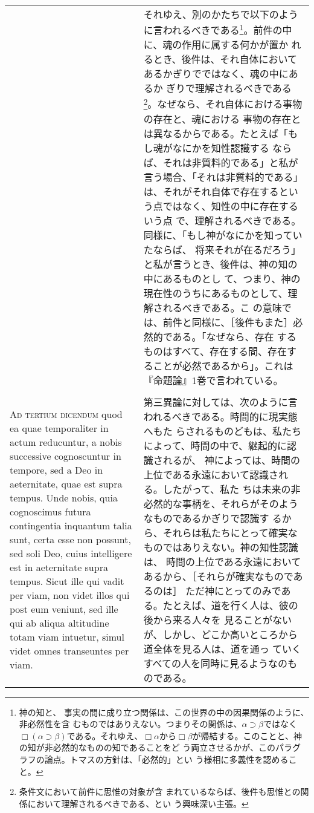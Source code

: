 \documentclass[10pt]{jsarticle} %
\begin{document}
\begin{longtable}{p{21em}p{21em}}
&

それゆえ、別のかたちで以下のように言われるべきである\footnote{神の知と、
事実の間に成り立つ関係は、この世界の中の因果関係のように、非必然性を含
むものではありえない。つまりその関係は、$\alpha \supset \beta$ではなく
$\Box(\alpha \supset \beta)$である。それゆえ、$\Box \alpha$から$\Box
\beta$が帰結する。このことと、神の知が非必然的なものの知であることをど
う両立させるかが、このパラグラフの論点。トマスの方針は、「必然的」とい
う様相に多義性を認めること。}。前件の中に、魂の作用に属する何かが置か
れるとき、後件は、それ自体においてあるかぎりでではなく、魂の中にあるか
ぎりで理解されるべきである\footnote{条件文において前件に思惟の対象が含
まれているならば、後件も思惟との関係において理解されるべきである、とい
う興味深い主張。}。なぜなら、それ自体における事物の存在と、魂における
事物の存在とは異なるからである。たとえば「もし魂がなにかを知性認識する
ならば、それは非質料的である」と私が言う場合、「それは非質料的である」
は、それがそれ自体で存在するという点ではなく、知性の中に存在するいう点
で、理解されるべきである。同様に、「もし神がなにかを知っていたならば、
将来それが在るだろう」と私が言うとき、後件は、神の知の中にあるものとし
て、つまり、神の現在性のうちにあるものとして、理解されるべきである。こ
の意味では、前件と同様に、［後件もまた］必然的である。「なぜなら、存在
するものはすべて、存在する間、存在することが必然であるから」。これは
『命題論』1巻で言われている。


\\\\


{\scshape Ad tertium dicendum} quod ea quae temporaliter in actum
reducuntur, a nobis successive cognoscuntur in tempore, sed a Deo in
aeternitate, quae est supra tempus. Unde nobis, quia cognoscimus
futura contingentia inquantum talia sunt, certa esse non possunt, sed
soli Deo, cuius intelligere est in aeternitate supra tempus. Sicut
ille qui vadit per viam, non videt illos qui post eum veniunt, sed
ille qui ab aliqua altitudine totam viam intuetur, simul videt omnes
transeuntes per viam.


&

第三異論に対しては、次のように言われるべきである。時間的に現実態へもた
らされるものどもは、私たちによって、時間の中で、継起的に認識されるが、
神によっては、時間の上位である永遠において認識される。したがって、私た
ちは未来の非必然的な事柄を、それらがそのようなものであるかぎりで認識す
るから、それらは私たちにとって確実なものではありえない。神の知性認識は、
時間の上位である永遠においてあるから、［それらが確実なものであるのは］
ただ神にとってのみである。たとえば、道を行く人は、彼の後から来る人々を
見ることがないが、しかし、どこか高いところから道全体を見る人は、道を通っ
ていくすべての人を同時に見るようなのものである。



\end{longtable}
\end{document}
